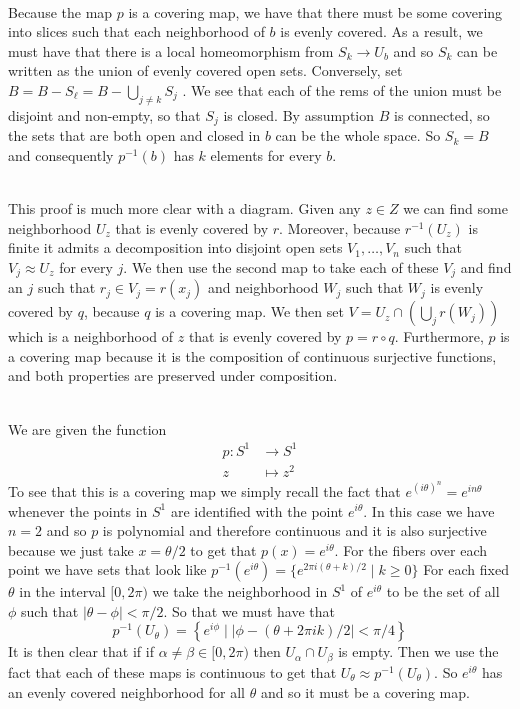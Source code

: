 \documentclass{article}
\DeclareMathOperator{\suchthat}{\mathrel{|}}
\newcommand{\problem}[1]{\noindent{\textbf{Problem #1}}\\}
\begin{document}
\problem{9.53.3} Because the map $p$ is a covering map, we have that there must be some covering into slices such that each neighborhood of $b$ is evenly covered. As a result, we must have that there is a local homeomorphism from $S_k \to U_b$ and so $S_k$ can be written as the union of evenly covered open sets. Conversely, set $B = B - S_\ell = B - \bigcup_{j \neq k} S_j$ . We see that each of the rems of the union must be disjoint and non-empty, so that $S_j$ is closed. By assumption $B$ is connected, so the sets that are both open and closed in $b$ can be the whole space. So $S_k = B$ and consequently $p^{-1}(b)$ has $k$ elements for every $b$. 

\problem{9.53.4} This proof is much more clear with a diagram. Given any $z \in Z$ we can find some neighborhood $U_z$ that is evenly covered by $r$. Moreover, because $r^{-1}(U_z)$ is finite it admits a decomposition into disjoint open sets $V_1, \ldots, V_n$ such that $V_j \approx U_z$ for every $j$. We then use the second map to take each of these $V_j$ and find an $j$ such that $r_j\in V_j = r(x_j)$ and neighborhood $W_j$ such that $W_j$ is evenly covered by $q$, because $q$ is a covering map. We then set $V = U_z \cap \left(\bigcup_j r(W_j)\right)$ which is a neighborhood of $z$ that is evenly covered by $p = r \circ q$. Furthermore, $p$ is a covering map because it is the composition of continuous surjective functions, and both properties are preserved under composition.

\problem{9.53.5} We are given the function 
\begin{align*}
p: S^1 &\to S^1 \\
z & \mapsto z^2
\end{align*}
To see that this is a covering map we simply recall the fact that $e^{(i\theta)^n} = e^{in\theta}$ whenever the points in $S^1$ are identified with the point $e^{i\theta}$. In this case we have $n = 2$ and so $p$ is polynomial and therefore continuous and it is also surjective because we just take $x = \theta/2$ to get that $p(x) = e^{i\theta}$. For the fibers over each point we have sets that look like $p^{-1}(e^{i\theta}) = \{e^{2\pi i(\theta + k)/2} \suchthat k \geq 0\}$ For each fixed $\theta$ in the interval $[0, 2\pi)$ we take the neighborhood in $S^1$ of $e^{i\theta}$ to be the set of all $\phi$ such that $|\theta - \phi| < \pi / 2$. So that we must have that 
\[
p^{-1}(U_{\theta}) = \left\{ e^{i\phi} \suchthat \left|\phi - (\theta + 2\pi ik)/2\right| < \pi / 4\right\}
\]
It is then clear that if if $\alpha \neq \beta \in [0, 2\pi)$ then $U_\alpha \cap U_\beta$ is empty. Then we use the fact that each of these maps is continuous to get that $U_\theta \approx p^{-1}(U_\theta)$. So $e^{i\theta}$ has an evenly covered neighborhood for all $\theta$ and so it must be a covering map. 
\end{document}
